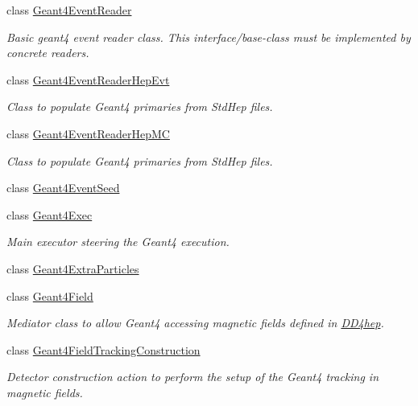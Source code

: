 \begin{DoxyCompactItemize}
class \hyperlink{class_d_d4hep_1_1_simulation_1_1_geant4_event_reader}{Geant4\+Event\+Reader}
\begin{DoxyCompactList}\small\item\em Basic geant4 event reader class. This interface/base-\/class must be implemented by concrete readers. \end{DoxyCompactList}\item 
class \hyperlink{class_d_d4hep_1_1_simulation_1_1_geant4_event_reader_hep_evt}{Geant4\+Event\+Reader\+Hep\+Evt}
\begin{DoxyCompactList}\small\item\em Class to populate Geant4 primaries from Std\+Hep files. \end{DoxyCompactList}\item 
class \hyperlink{class_d_d4hep_1_1_simulation_1_1_geant4_event_reader_hep_m_c}{Geant4\+Event\+Reader\+Hep\+MC}
\begin{DoxyCompactList}\small\item\em Class to populate Geant4 primaries from Std\+Hep files. \end{DoxyCompactList}\item 
class \hyperlink{class_d_d4hep_1_1_simulation_1_1_geant4_event_seed}{Geant4\+Event\+Seed}
\item 
class \hyperlink{class_d_d4hep_1_1_simulation_1_1_geant4_exec}{Geant4\+Exec}
\begin{DoxyCompactList}\small\item\em Main executor steering the Geant4 execution. \end{DoxyCompactList}\item 
class \hyperlink{class_d_d4hep_1_1_simulation_1_1_geant4_extra_particles}{Geant4\+Extra\+Particles}
\item 
class \hyperlink{class_d_d4hep_1_1_simulation_1_1_geant4_field}{Geant4\+Field}
\begin{DoxyCompactList}\small\item\em Mediator class to allow Geant4 accessing magnetic fields defined in \hyperlink{namespace_d_d4hep}{D\+D4hep}. \end{DoxyCompactList}\item 
class \hyperlink{class_d_d4hep_1_1_simulation_1_1_geant4_field_tracking_construction}{Geant4\+Field\+Tracking\+Construction}
\begin{DoxyCompactList}\small\item\em Detector construction action to perform the setup of the Geant4 tracking in magnetic fields. \end{DoxyCompactList}\item 

\end{DoxyCompactItemize}
